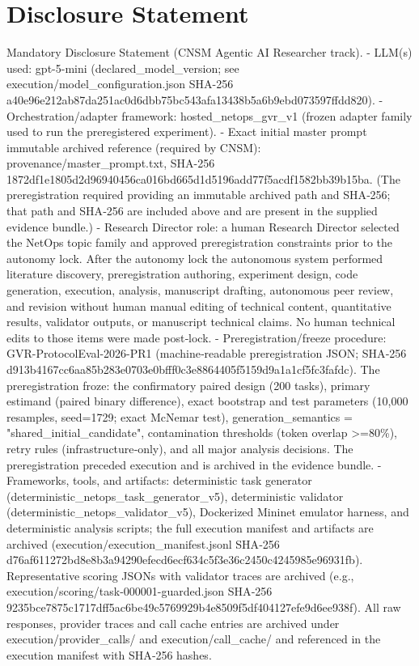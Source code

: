 \documentclass[conference]{IEEEtran}
\begin{document}
\section*{Disclosure Statement}
Mandatory Disclosure Statement (CNSM Agentic AI Researcher track).
- LLM(s) used: gpt-5-mini (declared\_model\_version; see execution/model\_configuration.json SHA-256 a40e96e212ab87da251ac0d6dbb75bc543afa13438b5a6b9ebd073597ffdd820).
- Orchestration/adapter framework: hosted\_netops\_gvr\_v1 (frozen adapter family used to run the preregistered experiment).
- Exact initial master prompt immutable archived reference (required by CNSM): provenance/master\_prompt.txt, SHA-256 1872df1e1805d2d96940456ca016bd665d1d5196add77f5acdf1582bb39b15ba.
  (The preregistration required providing an immutable archived path and SHA‑256; that path and SHA‑256 are included above and are present in the supplied evidence bundle.)
- Research Director role: a human Research Director selected the NetOps topic family and approved preregistration constraints prior to the autonomy lock. After the autonomy lock the autonomous system performed literature discovery, preregistration authoring, experiment design, code generation, execution, analysis, manuscript drafting, autonomous peer review, and revision without human manual editing of technical content, quantitative results, validator outputs, or manuscript technical claims. No human technical edits to those items were made post‑lock.
- Preregistration/freeze procedure: GVR-ProtocolEval-2026-PR1 (machine‑readable preregistration JSON; SHA‑256 d913b4167cc6aa85b283e0703e0bfff0c3e8864405f5159d9a1a1cf5fc3fafdc). The preregistration froze: the confirmatory paired design (200 tasks), primary estimand (paired binary difference), exact bootstrap and test parameters (10,000 resamples, seed=1729; exact McNemar test), generation\_semantics = "shared\_initial\_candidate", contamination thresholds (token overlap >=80\%), retry rules (infrastructure‑only), and all major analysis decisions. The preregistration preceded execution and is archived in the evidence bundle.
- Frameworks, tools, and artifacts: deterministic task generator (deterministic\_netops\_task\_generator\_v5), deterministic validator (deterministic\_netops\_validator\_v5), Dockerized Mininet emulator harness, and deterministic analysis scripts; the full execution manifest and artifacts are archived (execution/execution\_manifest.jsonl SHA‑256 d76af611272bd8e8b3a94290efecd6ecf634c5f3e36c2450c4245985e96931fb). Representative scoring JSONs with validator traces are archived (e.g., execution/scoring/task-000001-guarded.json SHA‑256 9235bce7875c1717dff5ac6be49c5769929b4e8509f5df404127efe9d6ee938f). All raw responses, provider traces and call cache entries are archived under execution/provider\_calls/ and execution/call\_cache/ and referenced in the execution manifest with SHA‑256 hashes.
\end{document}
